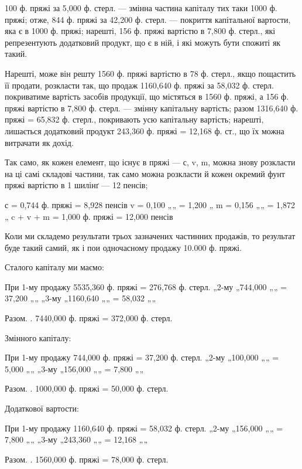 \parcont{}  %
100 ф. пряжі за 5,000 ф. стерл. — змінна частина капіталу тих таки
1000 ф. пряжі; отже, 844 ф. пряжі за 42,200 ф. стерл. — покриття
капітальної вартости, яка є в 1000 ф. пряжі; нарешті, 156 ф. пряжі
вартістю в 7,800 ф. стерл., які репрезентують додатковий продукт, що
є в ній, і які можуть бути спожиті як такий.

Нарешті, може він решту 1560 ф. пряжі вартістю в 78 ф. стерл.,
якщо пощастить її продати, розкласти так, що продаж 1160,640 ф.
пряжі за 58,032 ф. стерл. покриватиме вартість засобів продукції, що
містяться в 1560 ф. пряжі, а 156 ф. пряжі вартістю в 7,800 ф. стерл. —
змінну капітальну вартість; разом 1316,640 ф. пряжі = 65,832 ф. стерл.,
покривають усю капітальну вартість; нарешті, лишається додатковий
продукт 243,360 ф. пряжі = 12,168 ф. ст., що їх можна витрачати як
дохід.

Так само, як кожен елемент, що існує в пряжі — с, v, m, можна
знову розкласти на ці самі складові частини, так само можна розкласти й
кожен окремий фунт пряжі вартістю в 1 шилінґ — 12 пенсів;

с = 0,744 ф. пряжі = 8,928 пенсів
v = 0,100 „„ = 1,200 „
m = 0,156 „„ = 1,872 „
c + v + m = 1,000 ф. пряжі = 12,000 пенсів

Коли ми складемо результати трьох зазначених частинних продажів, то
результат буде такий самий, як і пои одночасному продажу 10.000 ф.
пряжі.

Сталого капіталу ми маємо:

При 1-му продажу 5535,360 ф. пряжі = 276,768 ф. стерл.
  „2-му „744,000 „„ = 37,200 „„
  „3-му „1160,640 „„ = 58,032 „„

                  Разом.  . 7440,000 ф. пряжі = 372,000    ф. стерл.

Змінного капіталу:

При 1-му продажу 744,000 ф. пряжі = 37,200 ф. стерл.
  „2-му „100,000 „„ = 5,000 „„
  „3-му „156,000 „„ = 7,800 „„

                Разом.  . 1000,000 ф. пряжі = 50,000 ф. стерл.

Додаткової вартости:

При 1-му продажу 1160,640 ф. пряжі = 58,032    ф. стерл.
  „2-му „156,000 „„ = 7,800 „„
  „3-му „243,360 „„ = 12,168 „„

                  Разом.  . 1560,000 ф. пряжі = 78,000 ф. стерл.
\parbreak{}  %
